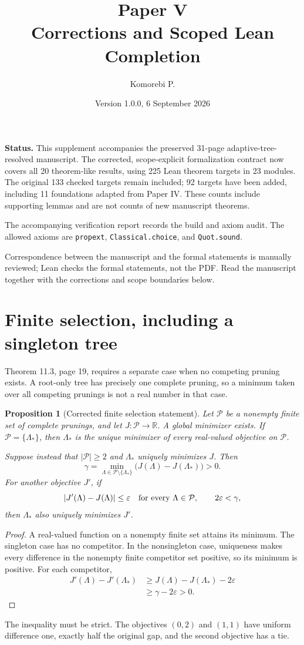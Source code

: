\documentclass[11pt]{article}
\title{Paper V\\Corrections and Scoped Lean Completion}
\author{Komorebi P.}
\date{Version 1.0.0, 6 September 2026}
\newtheorem{proposition}{Proposition}
\newcommand{\R}{\mathbb R}
\begin{document}
\maketitle
\noindent\textbf{Status.} This supplement accompanies the preserved 31-page adaptive-tree-resolved manuscript. The corrected, scope-explicit formalization contract now covers all 20 theorem-like results, using 225 Lean theorem targets in 23 modules. The original 133 checked targets remain included; 92 targets have been added, including 11 foundations adapted from Paper IV. These counts include supporting lemmas and are not counts of new manuscript theorems.

The accompanying verification report records the build and axiom audit. The allowed axioms are \texttt{propext}, \texttt{Classical.choice}, and \texttt{Quot.sound}.

Correspondence between the manuscript and the formal statements is manually reviewed; Lean checks the formal statements, not the PDF. Read the manuscript together with the corrections and scope boundaries below.

\section{Finite selection, including a singleton tree}
Theorem 11.3, page 19, requires a separate case when no competing pruning exists. A root-only tree has precisely one complete pruning, so a minimum taken over all competing prunings is not a real number in that case.

\begin{proposition}[Corrected finite selection statement]
Let $\mathcal P$ be a nonempty finite set of complete prunings, and let $J:\mathcal P\to\R$. A global minimizer exists. If $\mathcal P=\{\Lambda_*\}$, then $\Lambda_*$ is the unique minimizer of every real-valued objective on $\mathcal P$.

Suppose instead that $|\mathcal P|\ge2$ and $\Lambda_*$ uniquely minimizes $J$. Then
\[
\gamma=\min_{\Lambda\in\mathcal P\setminus\{\Lambda_*\}}
\bigl(J(\Lambda)-J(\Lambda_*)\bigr)>0.
\]
For another objective $J'$, if
\[
|J'(\Lambda)-J(\Lambda)|\le\varepsilon
\quad\hbox{for every }\Lambda\in\mathcal P,
\qquad 2\varepsilon<\gamma,
\]
then $\Lambda_*$ also uniquely minimizes $J'$.
\end{proposition}
\begin{proof}
A real-valued function on a nonempty finite set attains its minimum. The singleton case has no competitor. In the nonsingleton case, uniqueness makes every difference in the nonempty finite competitor set positive, so its minimum is positive. For each competitor,
\begin{align*}
J'(\Lambda)-J'(\Lambda_*)
&\ge J(\Lambda)-J(\Lambda_*)-2\varepsilon\\
&\ge\gamma-2\varepsilon>0.
\end{align*}
\end{proof}
The inequality must be strict. The objectives $(0,2)$ and $(1,1)$ have uniform difference one, exactly half the original gap, and the second objective has a tie.
\end{document}
